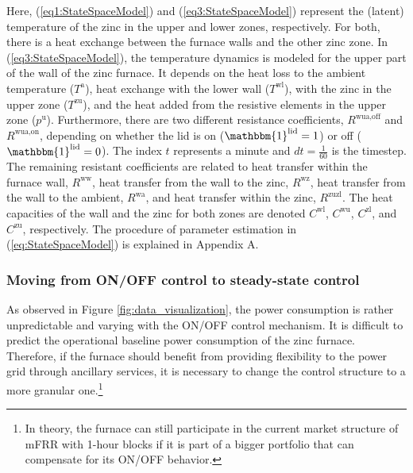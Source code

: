 \documentclass[conference]{IEEEtran}
\begin{document}
Here, (\ref{eq1:StateSpaceModel}) and (\ref{eq3:StateSpaceModel}) represent the (latent) temperature of the zinc in the upper and lower zones, respectively. For both, there is a heat exchange between the furnace walls and the other zinc zone. In (\ref{eq3:StateSpaceModel}), the temperature dynamics is modeled for the upper part of the wall of the zinc furnace. It depends on the heat loss to the ambient temperature ($T^{\text{a}}$), heat exchange with the lower wall ($T^{\text{wl}}$), with the zinc in the upper zone ($T^{\text{zu}}$), and the heat added from the resistive elements in the upper zone  ($p^{\text{u}}$). Furthermore, there are two different resistance coefficients, $R^{\text{wua},\text{off}}$ and $R^{\text{wua},\text{on}}$, depending on whether the lid is on ($ \mathbbm{1}^{\text{lid}} = 1$) or off ($ \mathbbm{1}^{\text{lid}} = 0$). The index $t$ represents a minute and $dt = \frac{1}{60}$ is the timestep. The remaining resistant coefficients are related to heat transfer within the furnace wall, $R^{\text{ww}}$, heat transfer from the wall to the zinc, $R^{\text{wz}}$, heat transfer from the wall to the ambient, $R^{\text{wa}}$, and heat transfer within the zinc, $R^{\text{zuzl}}$. The heat capacities of the wall and the zinc for both zones are denoted $C^{\text{wl}}$, $C^{\text{wu}}$, $C^{\text{zl}}$, and $C^{\text{zu}}$, respectively. The procedure of parameter estimation in (\ref{eq:StateSpaceModel}) is explained in Appendix A.


\subsubsection{Moving from ON/OFF control to steady-state control}

As observed in Figure \ref{fig:data_visualization}, the power consumption is rather unpredictable and varying with the ON/OFF control mechanism. It is difficult to predict the operational baseline power consumption of the zinc furnace. Therefore, if the furnace should benefit from providing flexibility to the power grid through ancillary services, it is necessary to change the control structure to a more granular one.\footnote{In theory, the furnace can still participate in the current market structure of mFRR with 1-hour blocks if it is part of a bigger portfolio that can compensate for its ON/OFF behavior.}
\end{document}
